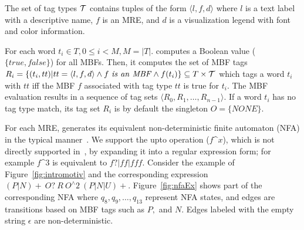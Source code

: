 The set of tag types ${\cal T}$ contains tuples of the form $\langle l,f,d\rangle$ 
where $l$ is a text label with a descriptive name, 
$f$ is an MRE, and $d$ is a visualization legend 
with font and color information.

For each word $t_i\in T, 0\le i < M, M=|T|$.
\framework computes a Boolean value 
($\{\mathit{true}, \mathit{false}\}$)
for all MBFs. 
Then, it computes the set of MBF tags
$R_i=\{(t_i,tt)| tt=\langle l,f,d\rangle \wedge
f~\mathit{is~an~MBF} \wedge f(t_i)\} \subseteq T \times {\cal T}$
which tags a word $t_i$ with $\mathit{tt}$ 
iff the MBF $f$ associated with
tag type $\mathit{tt}$ is true for $t_i$. 
The MBF evaluation results in a sequence of tag sets 
$\langle R_0, R_1, \ldots, R_{n-1}\rangle$.
If a word $t_i$ has no tag type match, 
its tag set $R_i$ is by default the singleton $O=\{\mathit{NONE}\}$.


For each MRE, 
\framework generates its equivalent non-deterministic finite automaton (NFA) in the typical manner~\cite{sipser2006introduction}.
We support the upto operation ($f$\^{}$x$), which is not directly 
supported in~\cite{sipser2006introduction}, by 
expanding it into a regular expression form; for example 
$f$\^{}$3$ is equivalent to $f?|ff|fff$. 
Consider the example of Figure~\ref{fig:intromotiv} and the
corresponding expression $(P|N)\!+~O?~R~O^\wedge 2~(P|N|U)+$. 
Figure~\ref{fig:nfaEx} shows part of the corresponding NFA where
$q_8, q_9, \dots, q_{13}$ represent NFA states,
and edges are transitions based on MBF tags such as 
$P,$ and $N$.
Edges labeled with the empty string $\epsilon$ are non-deterministic.

